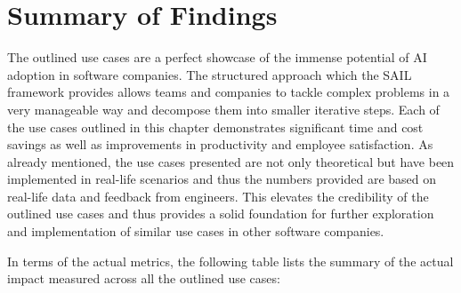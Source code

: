 \documentclass[]{imc-inf}
\begin{document}
\section{Summary of Findings}\label{summary-of-findings}
The outlined use cases are a perfect showcase of the immense potential of AI adoption in software companies. The structured approach which the SAIL framework provides allows teams and companies to tackle complex problems in a very manageable way and decompose them into smaller iterative steps. Each of the use cases outlined in this chapter demonstrates significant time and cost savings as well as improvements in productivity and employee satisfaction. As already mentioned, the use cases presented are not only theoretical but have been implemented in real-life scenarios and thus the numbers provided are based on real-life data and feedback from engineers. This elevates the credibility of the outlined use cases and thus provides a solid foundation for further exploration and implementation of similar use cases in other software companies.

In terms of the actual metrics, the following table lists the summary of the actual impact measured across all the outlined use cases:
\end{document}
